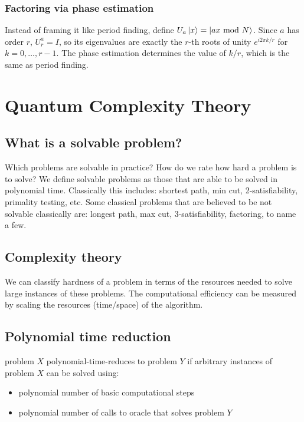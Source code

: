 \documentclass[11pt]{article}
\begin{document}
\subsubsection{Factoring via phase estimation}

Instead of framing it like period finding, define $U_a \ket{x} = \ket{ax \ \text{mod} \ N}$. Since $a$ has order $r$, $U_r^a = I$, so its eigenvalues are exactly the $r$-th roots of unity $e^{i 2 \pi k/r}$ for $k = 0, \dots, r-1$. The phase estimation determines the value of $k/r$, which is the same as period finding.

\section{Quantum Complexity Theory}


\subsection{What is a solvable problem?}

Which problems are solvable in practice? How do we rate how hard a problem is to solve? We define solvable problems as those that are able to be solved in polynomial time. Classically this includes: shortest path, min cut, 2-satisfiability, primality testing, etc. Some classical problems that are believed to be not solvable classically are: longest path, max cut, 3-satisfiability, factoring, to name a few.

\subsection{Complexity theory}

We can classify hardness of a problem in terms of the resources needed to solve large instances of these problems. The computational efficiency can be measured by scaling the resources (time/space) of the algorithm.

\subsection {Polynomial time reduction}

problem $X$ polynomial-time-reduces to problem $Y$ if arbitrary instances of problem $X$ can be solved using:

\begin{itemize}
	\item polynomial number of basic computational steps
	\item polynomial number of calls to oracle that solves problem $Y$
\end{itemize}
\end{document}
